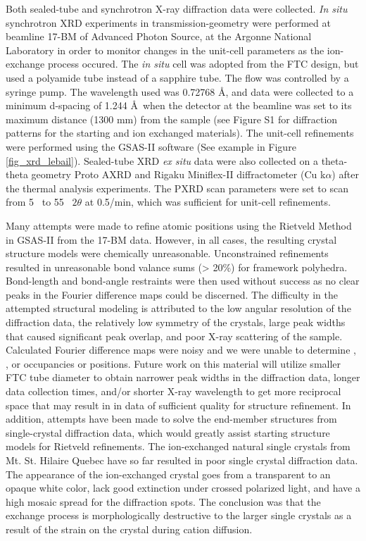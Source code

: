 \documentclass[journal=acsodf,manuscript=article]{achemso}
\begin{document}
{\label{methods_xrd}}  %

Both sealed-tube and synchrotron X-ray diffraction data were
collected. \emph{In situ} synchrotron XRD experiments in
transmission-geometry were performed at beamline 17-BM of Advanced
Photon Source, at the Argonne National Laboratory in order to monitor
changes in the unit-cell parameters as the ion-exchange process occured.
The \emph{in situ} cell was adopted from the FTC design, but used a polyamide tube
instead of a sapphire tube. The flow was controlled by a syringe pump.
The wavelength used was 0.72768 \AA, and data were collected to a minimum
d-spacing of 1.244 \AA\ when the detector at the beamline was set to its
maximum distance (1300 mm) from the sample (see Figure S1 for diffraction patterns for the starting and ion exchanged materials). The unit-cell refinements
were performed using the GSAS-II software \cite{Toby_2013} (See
example in Figure {\ref{fig_xrd_lebail}}). Sealed-tube
XRD \emph{ex situ} data were also collected on a theta-theta geometry
Proto AXRD and Rigaku Miniflex-II diffractometer (Cu
k\(\alpha\)) after the thermal analysis experiments.  The PXRD
scan parameters were set to scan from 5 \degree\
to 55 \degree\ \(2\theta\) at 0.5\degree/min,
which was sufficient for unit-cell refinements.


Many attempts were made to refine atomic positions using the Rietveld
Method in GSAS-II from the 17-BM data.  However, in all cases, the
resulting crystal structure models were chemically unreasonable. 
Unconstrained refinements resulted in unreasonable bond valance sums
(\textgreater{} 20\%) for framework polyhedra.  Bond-length and
bond-angle restraints were then used without success as no clear peaks
in the Fourier difference maps could be discerned.  The difficulty in
the attempted structural modeling is attributed to the low angular
resolution of the diffraction data, the relatively low symmetry of the
crystals, large peak widths that caused significant peak overlap, and
 poor X-ray scattering of the sample.  Calculated Fourier difference
maps were noisy and we were unable to determine \ce{Na+},
, or  occupancies or positions. Future work on this material will utilize smaller FTC tube diameter to
obtain narrower peak widths in the diffraction data, longer data
collection times, and/or shorter X-ray wavelength to get more reciprocal
space that may result in in data of sufficient quality for
structure refinement.  In addition, attempts have been made to solve the
end-member structures from single-crystal diffraction data, which would
greatly assist starting structure models for Rietveld refinements.  The
ion-exchanged natural single crystals from Mt. St. Hilaire Quebec have
so far resulted in poor single crystal diffraction data.  The appearance of the 
ion-exchanged crystal goes from a transparent to an opaque
white color, lack good extinction under crossed polarized light, and
have a high mosaic spread for the diffraction spots.  The conclusion was
that the exchange process is morphologically destructive to the larger single crystals as a result of the strain on the crystal during cation diffusion.
\end{document}

